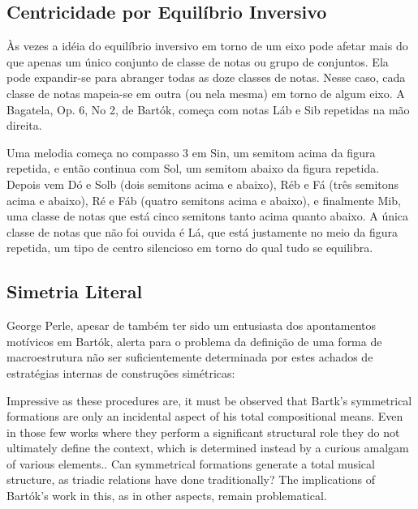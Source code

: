 \documentclass[
	12pt,				%
	openright,			%
	twoside,			%
	a4paper,			%
	english,			%
	french,				%
	spanish,			%
	brazil				%
	]{abntex2}
\begin{document}
\subsection{Centricidade por Equilíbrio Inversivo}


\begin{citacao}
Às vezes a idéia do equilíbrio inversivo em torno de um eixo pode afetar mais do que
apenas um único conjunto de classe de notas ou grupo de conjuntos. Ela pode expandir-se
para abranger todas as doze classes de notas. Nesse caso, cada classe de notas mapeia-se
em outra (ou nela mesma) em torno de algum eixo. A Bagatela, Op. 6, No 2, de Bartók,
começa com notas Láb e Sib repetidas na mão direita.

Uma melodia começa no compasso 3 em Sin, um semitom acima da figura repetida, e
então continua com Sol, um semitom abaixo da figura repetida. Depois vem Dó e Solb
(dois semitons acima e abaixo), Réb e Fá (três semitons acima e abaixo), Ré e Fáb (quatro
semitons acima e abaixo), e finalmente Mib, uma classe de notas que está cinco semitons
tanto acima quanto abaixo. A única classe de notas que não foi ouvida é Lá, que está
justamente no meio da figura repetida, um tipo de centro silencioso em torno do qual tudo
se equilibra.
\cite[ p.121]{straus2004}
\end{citacao}



\subsection{Simetria Literal}


George Perle, apesar de também ter sido um entusiasta dos apontamentos motívicos em Bartók, alerta para o problema da definição de uma forma de macroestrutura não ser suficientemente determinada por estes achados de estratégias internas de construções simétricas:

\begin{citacao}
Impressive as these procedures are, it must be observed that Bartk's symmetrical formations 
are only an incidental aspect of his total compositional means. Even in those few works where they perform a significant structural role they do not ultimately define the context, which is determined
instead by a curious amalgam of various elements..
Can symmetrical formations generate a total musical structure, as triadic relations have done traditionally? The implications of Bartók's work in this, as in other aspects, remain problematical.
\end{citacao}
\end{document}
